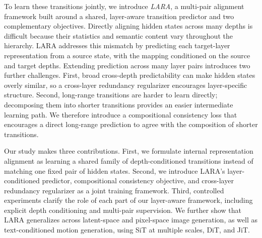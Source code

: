 To learn these transitions jointly, we introduce \emph{LARA}, a multi-pair alignment framework built around a shared, layer-aware transition predictor and two complementary objectives. Directly aligning hidden states across many depths is difficult because their statistics and semantic content vary throughout the hierarchy. LARA addresses this mismatch by predicting each target-layer representation from a source state, with the mapping conditioned on the source and target depths. Extending prediction across many layer pairs introduces two further challenges. First, broad cross-depth predictability can make hidden states overly similar, so a cross-layer redundancy regularizer encourages layer-specific structure. Second, long-range transitions are harder to learn directly; decomposing them into shorter transitions provides an easier intermediate learning path. We therefore introduce a compositional consistency loss that encourages a direct long-range prediction to agree with the composition of shorter transitions.

Our study makes three contributions. First, we formulate internal representation alignment as learning a shared family of depth-conditioned transitions instead of matching one fixed pair of hidden states. Second, we introduce LARA's layer-conditioned predictor, compositional consistency objective, and cross-layer redundancy regularizer as a joint training framework. Third, controlled experiments clarify the role of each part of our layer-aware framework, including explicit depth conditioning and multi-pair supervision. We further show that LARA generalizes across latent-space and pixel-space image generation, as well as text-conditioned motion generation, using SiT at multiple scales, DiT, and JiT.
